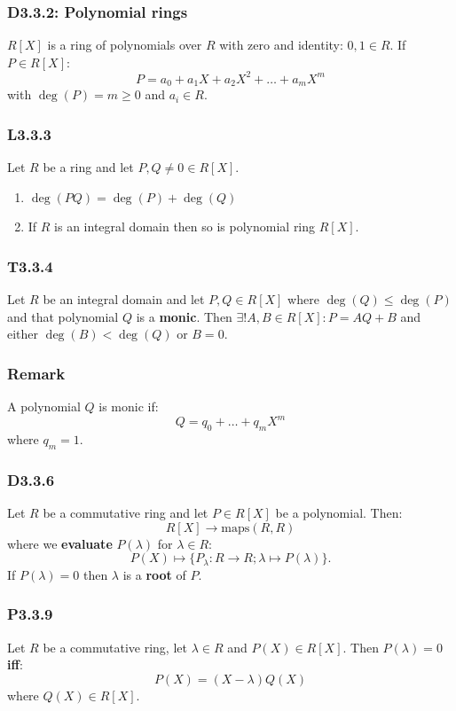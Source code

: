 \documentclass{article}
\begin{document}
\begin{multicols*}{3}
\subsubsection*{D3.3.2: Polynomial rings}
$R[X]$ is a ring of polynomials over $R$ 
with zero and identity: $0,1\in R$. If $P\in R[X]$:
$$P=a_0+a_1 X+a_2 X^2+\dots+a_m X^m$$
with $\deg(P)=m\geq0$ and $a_i\in R$.

\subsubsection*{L3.3.3}
Let $R$ be a ring and let $P,Q\neq0\in R[X]$.
\begin{enumerate}
    \item $\deg(PQ)=\deg(P)+\deg(Q)$
    \item If $R$ is an integral domain then
    so is polynomial ring $R[X]$.
\end{enumerate}

\subsubsection*{T3.3.4}
Let $R$ be an integral domain and
let $P,Q\in R[X]$ where $\deg(Q)\leq\deg(P)$
and that polynomial $Q$ is a \textbf{monic}.
Then $\exists!A,B\in R[X]:P=AQ+B$ and either
$\deg(B)<\deg(Q)$ or $B=0$.

\subsubsection*{Remark}
A polynomial $Q$ is monic if:
$$Q=q_0+\dots+q_m X^m$$
where $q_m=1$.

\subsubsection*{D3.3.6}
Let $R$ be a commutative ring and let $P\in R[X]$
be a polynomial. Then:
$$R[X]\rightarrow\text{maps}(R,R)$$
where we \textbf{evaluate} $P(\lambda)$ for $\lambda\in R$:
$$P(X)\mapsto\{P_{\lambda}:R\rightarrow R;
\lambda\mapsto P(\lambda)\}.$$
If $P(\lambda)=0$ then $\lambda$ is a 
\textbf{root} of $P$.

\subsubsection*{P3.3.9}
Let $R$ be a commutative ring, let $\lambda\in R$
and $P(X)\in R[X]$. Then $P(\lambda)=0$ \textbf{if{}f}:
$$P(X)=(X-\lambda)Q(X)$$
where $Q(X)\in R[X]$.


\end{multicols*}
\end{document}
